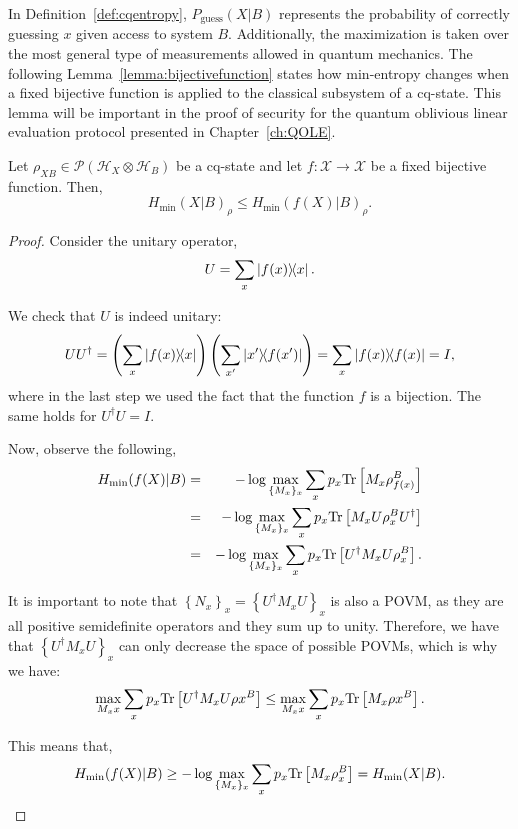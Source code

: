 In Definition~\ref{def:cqentropy}, $P_{\text{guess}}(X|B)$ represents the probability of correctly guessing $x$ given access to system $B$. Additionally, the maximization is taken over the most general type of measurements allowed in quantum mechanics. The following Lemma~\ref{lemma:bijectivefunction} states how min-entropy changes when a fixed bijective function is applied to the classical subsystem of a cq-state. This lemma will be important in the proof of security for the quantum oblivious linear evaluation protocol presented in Chapter~\ref{ch:QOLE}.

\begin{lemma}
Let $\rho_{XB} \in \mathcal{P}(\mathcal{H}_{X}\otimes \mathcal{H}_B)$ be a cq-state and let $f:\mathcal{X} \rightarrow \mathcal{X} $ be a fixed bijective function. Then,
$$H_{\min}(X|B)_{\rho} \leq H_{\min}(f(X)|B)_{\rho}.$$
\label{lemma:bijectivefunction}
\end{lemma}
\begin{proof}
Consider the unitary operator,
$$U = \sum_x \ketbra{f(x)}{x}.$$ 

We check that $U$ is indeed unitary:
\begin{equation*}
U U^{\dagger} = \left(\sum_x \ketbra{f(x)}{x}\right)\left(\sum_{x'} \ketbra{x'}{f(x')}\right) 
= \sum_x \ketbra{f(x)} = I,
\end{equation*}
where in the last step we used the fact that the function $f$ is a bijection. The same holds for $U^{\dagger}U = I$.

Now, observe the following,
\begin{eqnarray*}
H_{\min}(f(X)|B) &=& -\log \max_{\{M_x\}_x} \sum_x p_x \text{Tr}\left[M_x \rho_{f(x)}^B\right]\\
&=& -\log \max_{\{M_x\}_x} \sum_x p_x \text{Tr}\left[M_x U \rho_{x}^B U^{\dagger}\right]\\
&=& -\log \max_{\{M_x\}_x} \sum_x p_x \text{Tr}\left[U^{\dagger} M_x U \rho_{x}^B \right]. 
\end{eqnarray*}

It is important to note that $\left\{ N_x \right\}_x= \left\{U^{\dagger} M_x U\right\}_x$ is also a POVM, as they are all positive semidefinite operators and they sum up to unity. Therefore, we have that $\left\{U^{\dagger} M_x U\right\}_x$ can only decrease the space of possible POVMs, which is why we have:
$$\max_{{M_x}x} \sum_x p_x \text{Tr}\left[U^{\dagger} M_x U \rho{x}^B \right] \leq \max_{{M_x}x} \sum_x p_x \text{Tr}\left[ M_x \rho{x}^B \right].$$

This means that, 
\begin{equation*}
H_{\min}(f(X)|B) \geq -\log \max_{\{M_x\}_x} \sum_x p_x \text{Tr}\left[ M_x \rho_{x}^B \right] = H_{\min}(X|B).
\end{equation*}
\end{proof}

